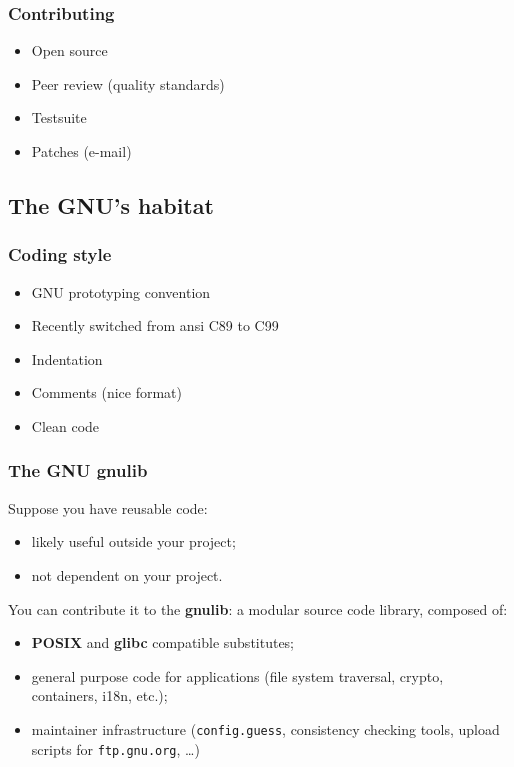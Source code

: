 \documentclass{beamer}
\begin{document}
\begin{frame}
  \frametitle{Contributing}
    \begin{itemize}
      \item Open source
      \item Peer review (quality standards)
      \item Testsuite
      \item Patches (e-mail)
    \end{itemize}
\end{frame}

\subsection{The GNU's habitat}

\begin{frame}
  \frametitle{Coding style}
    \begin{itemize}
      \item GNU prototyping convention
      \item Recently switched from ansi C89 to C99
      \item Indentation
      \item Comments (nice format)
      \item Clean code
    \end{itemize}
\end{frame}

\begin{frame}
  \frametitle{The GNU gnulib}
  Suppose you have reusable code:
  \begin{itemize}
    \item likely useful outside your project;
    \item not dependent on your project.
  \end{itemize}
  \vfill
  You can contribute it to the \textbf{gnulib}: a modular source code library,
  composed of:
    \begin{itemize}
      \item \textbf{POSIX} and \textbf{glibc} compatible substitutes;
      \item general purpose code for applications (file system traversal,
        crypto, containers, i18n, etc.);
      \item maintainer infrastructure (\texttt{config.guess}, consistency
        checking tools, upload scripts for \texttt{ftp.gnu.org}, \ldots)
    \end{itemize}
\end{frame}
\end{document}
